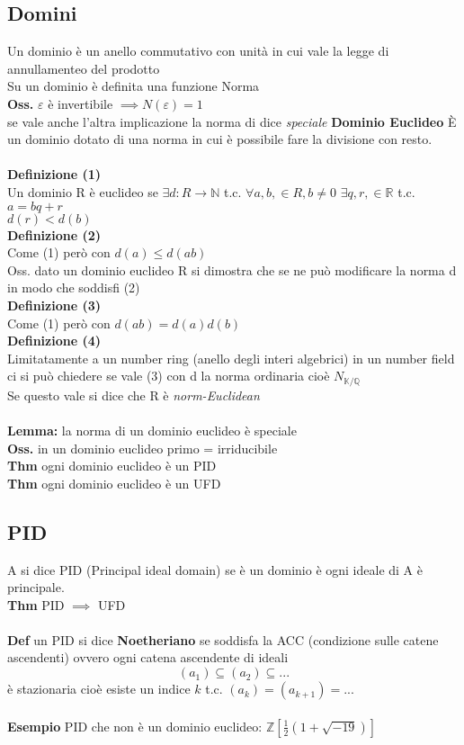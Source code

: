 \documentclass[10pt,a4paper]{article}
\begin{document}
\subsection{Domini}
Un dominio è un anello commutativo con unità in cui vale la legge di annullamenteo del prodotto\\
Su un dominio è definita una funzione Norma\\
\textbf{Oss.} $\varepsilon$ è invertibile $\implies N(\varepsilon)=1$\\
se vale anche l'altra implicazione la norma di dice \textit{speciale}
%
%
\textbf{Dominio Euclideo}
È un dominio dotato di una norma in cui è possibile fare la divisione con resto.\\\\
\textbf{Definizione (1)}\\
Un dominio R è euclideo se $\exists d:R \to \mathbb{N}$ t.c.
$\forall a,b, \in R, b\neq 0$ $\exists q,r,\in \mathbb{R}$ t.c.\\
$a= bq+r$\\
$d(r) < d(b)$\\
\textbf{Definizione (2)}\\
Come (1) però con $d(a) \leq d(ab)$\\
Oss. dato un dominio euclideo R si dimostra che se ne può modificare la norma d in modo che soddisfi (2)\\
\textbf{Definizione (3)}\\
Come (1) però con $ d(ab) = d(a)d(b) $\\
\textbf{Definizione (4)}\\
Limitatamente a un number ring (anello degli interi algebrici) in un number field ci si può chiedere se vale (3) con d la norma ordinaria cioè $N_{\mathbb{K}/{\mathbb{Q}}}$\\
Se questo vale si dice che R è \textit{norm-Euclidean}\\\\
\textbf{Lemma:} la norma di un dominio euclideo è speciale\\
\textbf{Oss.} in un dominio euclideo primo = irriducibile\\
\textbf{Thm} ogni dominio euclideo è un PID\\
\textbf{Thm} ogni dominio euclideo è un UFD
%
%
\subsection{PID}
A si dice PID (Principal ideal domain) se è un dominio è ogni ideale di A è principale.\\
\textbf{Thm} PID $\implies$ UFD\\\\
\textbf{Def} un PID si dice \textbf{Noetheriano} se soddisfa la ACC (condizione sulle catene ascendenti) ovvero ogni catena ascendente di ideali\\
$$ (a_1) \subseteq (a_2) \subseteq ...$$
è stazionaria cioè esiste un indice $k$ t.c. $(a_k)=(a_{k+1})=...$\\\\
\textbf{Esempio} PID che non è un dominio euclideo: $\mathbb{Z}[\frac{1}{2}(1+\sqrt {-19})]$
\end{document}
